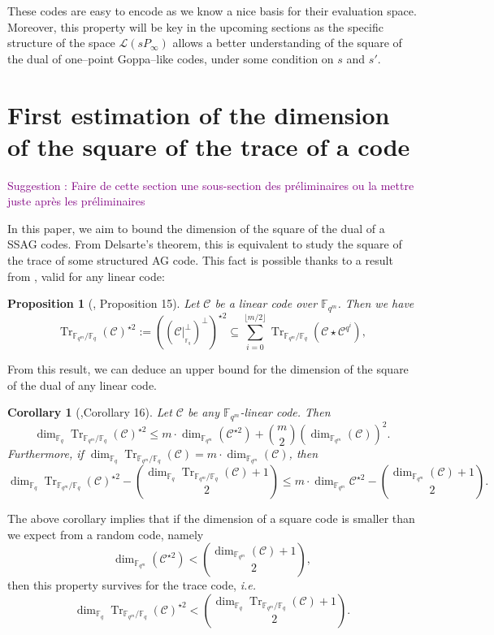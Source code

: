 \documentclass[a4paper]{article}
\newtheorem{proposition}[thm]{Proposition}
\newtheorem{coro}[thm]{Corollary}
\theoremstyle{definition}
\theoremstyle{remark}
\newcommand{\calL}{\mathcal{L}}
\newcommand{\calC}{\mathcal{C}}
\newcommand{\fqm}{\mathbb{F}_{q^m}}
\newcommand{\fq}{\mathbb{F}_{q}}
\newcommand{\Tr}[1]{\operatorname{Tr}_{\mathbb{F}_{q^m}/\fq}\left(#1\right)}
\newcommand\jade[1]{\textcolor{purple}{#1}}
\begin{document}
These codes are easy to encode as we know a nice basis for their evaluation space. Moreover, this property will be key in the upcoming sections as the specific structure of the space $\calL(sP_\infty)$ allows a better understanding of the square of the dual of one--point Goppa--like codes, under some condition on $s$ and $s'$.



\section{First estimation of the dimension of the square of the trace of a code}
\jade{Suggestion : Faire de cette section une sous-section des préliminaires ou la mettre juste après les préliminaires}

In this paper, we aim to bound the dimension of the square of the dual of a SSAG codes. From Delsarte's theorem, this is equivalent to study the square of the trace of some structured AG code. 
This fact is possible thanks to a result from \cite{MT21}, valid for any linear code:

\begin{proposition}[\cite{MT21}, Proposition 15] \label{prop:Tr_BoundSchurSquare}
Let $\calC$ be a linear code over $\fqm$. Then we have 
\begin{equation} \label{eq:key_equation} \Tr{\calC}^{\star2} := ((\calC|^{\perp}_{_{{\mathbb{F}_q}}})^{\perp})^{\star2} \subseteq \sum\limits_{i=0}^{\lfloor{m/2} \rfloor} \Tr{\calC\star \calC^{q^i}},
\end{equation}
\end{proposition}

From this result, we can deduce an upper bound for the dimension of the square of the dual of any linear code.

\begin{coro} [\cite{MT21},Corollary 16]\label{coro:first_bound_square_of_trace}
Let $\calC$ be any $\fqm$-linear code. Then 
\begin{equation} \label{eq:mumford_bound}
    \dim_{\fq}\Tr{\calC}^{\star2} \leq m \cdot \dim_{\fqm}(\calC^{\star 2}) + \binom{m}{2} (\dim_{\fqm}(\calC))^2.
\end{equation}
Furthermore, if $\dim_{\fq} \Tr{\calC} = m \cdot \dim_{\fqm}(\calC)$, then 
\[\dim_{\fq} \Tr{\calC}^{\star2} - \binom{\dim_{\fq} \Tr{\calC}+1}{2} \leq m \cdot \dim_{\fqm} \calC^{\star 2} - \binom{\dim_{\fqm} (\calC)+1}{2}.\]
\end{coro}

The above corollary implies that if the dimension of a square code is smaller than we expect from a random code, namely
\[ \dim_{\fqm} (\calC^{\star 2}) < \binom{\dim_{\fqm} (\calC)+1}{2},\]
then this property survives for the trace code, \emph{i.e.}
\[\dim_{\fq} \Tr{\calC}^{\star 2} < \binom{\dim_{\fq} \Tr{\calC}+1}{2}.\]
\end{document}
